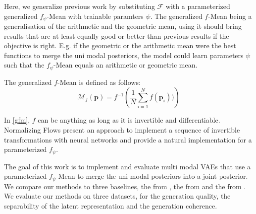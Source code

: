 Here, we generalize previous work by substituting $\mathcal{F}$ with a parameterized generalized $f_{\psi}$-Mean \parencite{niculescu_convex_2018} with trainable paramters $\psi$.
The generalized $f$-Mean being a generalisation of the arithmetic and the geometric mean, using it should bring results that are at least equally good or better than previous results if the objective is right.
E.g. if the geometric or the arithmetic mean were the best functions to merge the uni modal posteriors, the model could learn parameters $\psi$ such that the $f_{\psi}$-Mean equals an arithmetic or geometric mean.

The generalized $f$-Mean is defined as follows:
\begin{equation}
    \label{gfm}
    \mathcal{M}_{f}\left( \textbf{p} \right) = f^{-1}\left( \frac{1}{N} \sum ^N _{i=1} f(\textbf{p}_i)) \right)
\end{equation}

In \cref{gfm}, $f$ can be anything as long as it is invertible and differentiable.
Normalizing Flows \parencite{papamakarios_normalizing_2019} present an approach to implement a sequence of invertible transformations with neural networks and provide a natural implementation for a parameterized $f_{\psi}$.




\bigskip
The goal of this work is to implement and evaluate multi modal VAEs that use a parameterized $f_{\psi}$-Mean to merge the uni modal posteriors into a joint posterior.
We compare our methods to three baselines, the  from \cite{poe}, the  from \cite{shi2019variational} and the  from \cite{thomas_gener-ELBO}.
We evaluate our methods on three datasets, for the generation quality, the separability of the latent representation and the generation coherence.

\vspace{3cm}

